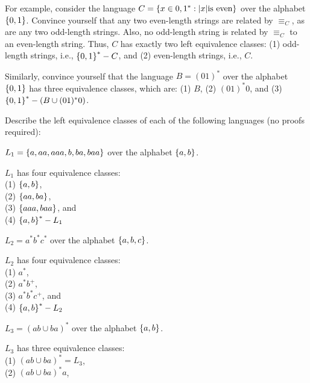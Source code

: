 \begin{problem}
\begin{enumalph}
      \step
      For example, consider the language
      $C = \left\{x \in {0,1}^* : \lvert x\rvert \text{is even}\right\}$ 
      over the alphabet $\left\{0,1\right\}$.
      Convince yourself that any two even-length strings
      are related by $\equiv_C$, as are any two odd-length strings.
      Also, no odd-length string is related by $\equiv_C$ 
      to an even-length string.
      Thus, $C$ has exactly two left equivalence classes:
      (1) odd-length strings, i.e., $\left\{0, 1\right\}^* - C$,
      and (2) even-length strings, i.e., $C$.

      \step
      Similarly, convince yourself that the language $B = (01)^*$
      over the alphabet $\left\{0, 1\right\}$ has three equivalence classes,
      which are:
      (1) $B$,
      (2) $(01)^*0$, and
      (3) $\left\{0, 1\right\}^* - (B \cup (01)^*0)$.

      \step
      Describe the left equivalence classes of each of the following
      languages (no proofs required):
      \begin{enumroman}
        \item $L_1 = \left\{a, aa, aaa, b, ba, baa\right\}$ over the alphabet $\left\{a, b\right\}$.
          \begin{Answer}
            $L_1$ has four equivalence classes:\\
            (1) $\left\{a, b\right\}$,\\
            (2) $\left\{aa, ba\right\}$,\\
            (3) $\left\{aaa, baa\right\}$, and\\
            (4) $\left\{a, b\right\}^* - L_1$ 
          \end{Answer}
        \item $L_2 = a^*b^*c^*$ over the alphabet $\left\{a, b, c\right\}$.
          \begin{Answer}
            $L_2$ has four equivalence classes:\\
            (1) $a^*$,\\
            (2) $a^*b^+$,\\
            (3) $a^*b^*c^+$, and\\
            (4) $\left\{a, b\right\}^* - L_2$ 
          \end{Answer}
        \item $L_3 = (ab \cup ba)^*$ over the alphabet $\left\{a, b\right\}$.
          \begin{Answer}
            $L_3$ has three equivalence classes:\\
            (1) $(ab \cup ba)^* = L_3$,\\
            (2) $(ab \cup ba)^*a$,\\

\end{Answer}
\end{enumroman}
\end{enumalph}
\end{problem}
